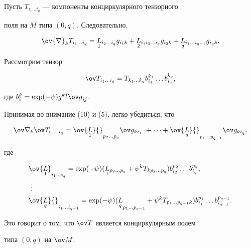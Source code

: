 \begin{pf}


Пусть $T_{i_1\dotsc i_q}$ --- компоненты конциркулярного тензорного 


поля на $M$ типа $(0,q)$. Следовательно,


$$


\ov {\nabla}_kT_{i_1\dotsc i_q}=


\underset{1}{L}{}_{i_{2}\dotsc i_{q}} g_{i_{1}k}


+\underset{2}{L}{}_{i_1 i_3\dotsc i_q} g_{i_{2}k}


+ \underset{q}{L}{}_{i_1\dotsc i_{q-1}} g_{i_{q}k}.


$$


Рассмотрим тензор


$$


\ov T_{i_1\dotsc i_q}=


T_{k_1\dotsc k_q} b^{k_1}_{i_{1}} \dotsc b^{k_q}_{i_{q}},


$$


где $b^k_i=\exp (-\psi)g^{kj}{\ov g}_{ij}$. 


Принимая во внимание (10) и (5), легко убедиться, что


$$


\ov \nabla_k\ov T_{i_1\dotsc i_q}=


\ov {\underset{1}{L}}{}_{p_2\dotsc p_q}


\ov g_{ki_1}\ +\dotsb +\ov {\underset{q}{L}}{}_{p_1\dotsc p_{q-1}}


\ov g_{ki_q},


$$


где


\begin{align}


&\ov{\underset{1}{L}{}}_{i_1\dotsc i_q}=\exp (-\psi)


(\underset{1}{L}{}_{p_2\dotsc p_q}+


\psi^kT_{k p_2\dotsc p_q})b^{p_2}_{i_{2}}\dotsc


b^{p_q}_{i_{q}}, \notag\\


&\ \vdots \\ 


&\ov {\underset{q}{L}}{}_{i_1\dotsc i_{q-1}}=\exp(-\psi)


(\underset{q}{L}_{p_1\dotsc p_{q-1}}+\psi^k


T_{p_1\dotsc p_{q-1} {}k})b^{p_1}_{i_{1}} \dotsc


b^{p_{q-1}}_{i_{q-1}}.\notag


\end{align}


Это говорит о том, что $\ov T$ является конциркулярным полем 


типа $(0, q)$ на $\ov M$.


\end{pf}





